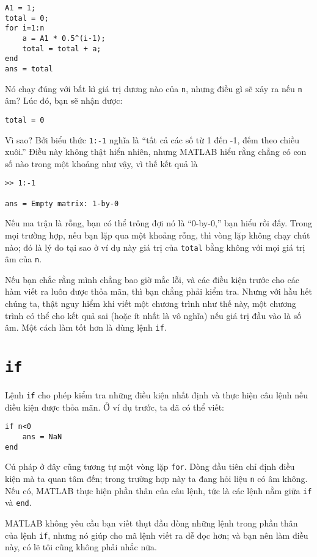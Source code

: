 \documentclass[12pt]{book}
\begin{document}
\begin{verbatim}
A1 = 1;
total = 0;
for i=1:n
    a = A1 * 0.5^(i-1);
    total = total + a;
end
ans = total
\end{verbatim}
%
Nó chạy đúng với bất kì giá trị dương nào của {\tt n}, nhưng
điều gì sẽ xảy ra nếu {\tt n} âm? Lúc đó, bạn sẽ nhận được:

\begin{verbatim}
total = 0
\end{verbatim}

Vì sao? Bởi biểu thức {\tt 1:-1} nghĩa là ``tất cả các số từ
1 đến -1, đếm theo chiều xuôi.'' Điều này không thật hiển nhiên, 
nhưng MATLAB hiểu rằng chẳng có con số nào trong một
khoảng như vậy, vì thế kết quả là

\begin{verbatim}
>> 1:-1

ans = Empty matrix: 1-by-0
\end{verbatim}
%
Nếu ma trận là rỗng, bạn có thể trông đợi nó là ``0-by-0,'' 
bạn hiểu rồi đấy. Trong mọi trường hợp, nếu bạn lặp qua một
khoảng rỗng, thì vòng lặp không chạy chút nào; đó là lý do 
tại sao ở ví dụ này giá trị của {\tt total} bằng không với mọi
giá trị âm của {\tt n}.

Nếu bạn chắc rằng mình chẳng bao giờ mắc lỗi, và các 
điều kiện trước cho các hàm viết ra luôn được thỏa mãn, thì bạn
chẳng phải kiểm tra. Nhưng với hầu hết chúng ta, thật nguy hiểm
khi viết một chương trình như thế này, một chương trình có thể
cho kết quả sai (hoặc ít nhất là vô nghĩa) nếu giá trị đầu vào
là số âm. Một cách làm tốt hơn là dùng lệnh {\tt if}.


\section{{\tt if}}

Lệnh {\tt if} cho phép kiểm tra những điều kiện nhất định và
thực hiện câu lệnh nếu điều kiện được thỏa mãn. Ở ví dụ trước,
ta đã có thể viết:

\begin{verbatim}
if n<0
    ans = NaN
end
\end{verbatim}
%
Cú pháp ở đây cũng tương tự một vòng lặp {\tt for}. Dòng đầu tiên
chỉ định điều kiện mà ta quan tâm đến; trong trường hợp này
ta đang hỏi liệu {\tt n} có âm không.  Nếu có, MATLAB thực hiện
phần thân của câu lệnh, tức là các lệnh nằm giữa 
{\tt if} và {\tt end}.

MATLAB không yêu cầu bạn viết thụt đầu dòng những lệnh trong
phần thân của lệnh {\tt if}, nhưng nó giúp cho mã lệnh viết ra 
dễ đọc hơn; và bạn nên làm điều này, có lẽ tôi cũng không phải
nhắc nữa.
\end{document}
